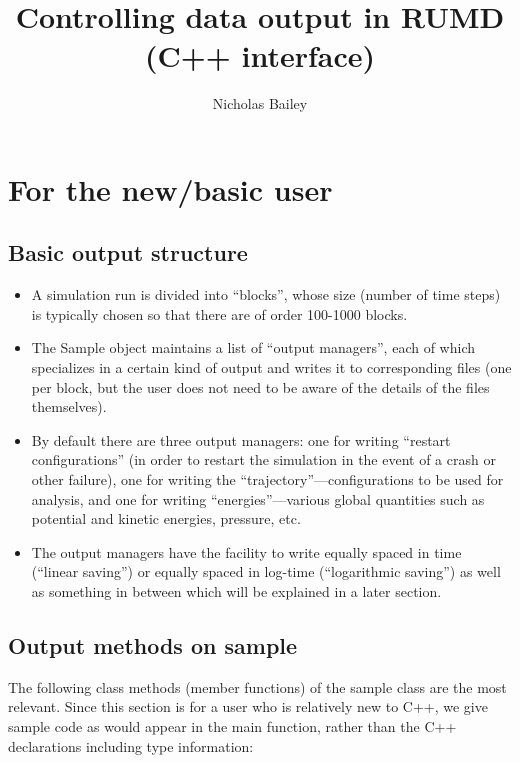 \documentclass[a4paper]{article}
\title{Controlling data output in RUMD (C++ interface)}
\author{Nicholas Bailey}
\begin{document}
\maketitle

\section{For the new/basic user}



\subsection{Basic output structure}

\begin{itemize}
\item A simulation run is divided into ``blocks'', whose size (number of time 
steps) is typically chosen so that there are of order 100-1000 blocks.
\item The Sample object maintains a list of ``output managers'', each of which
specializes in a certain kind of output and writes it to corresponding files
 (one per block, but the user does not need to be aware of the details of the 
files themselves).
\item By default there are three output managers: one for writing ``restart 
configurations'' (in order to restart the simulation in the event of a crash or 
other failure), one for writing the ``trajectory''---configurations to be used 
for analysis, and one for writing ``energies''---various global quantities such
 as potential and kinetic energies, pressure, etc.
\item The output managers have the facility to write equally spaced in time
 (``linear saving'') or equally spaced in log-time (``logarithmic saving'') as
well as something in between which will be explained in a later section.
\end{itemize}

\subsection{Output methods on sample}


The following class methods (member functions) of the sample class are the
most relevant. Since this section is for a user who is relatively new to
C++, we give sample code as would appear in the main function, rather than the
C++ declarations including type information:
\end{document}
